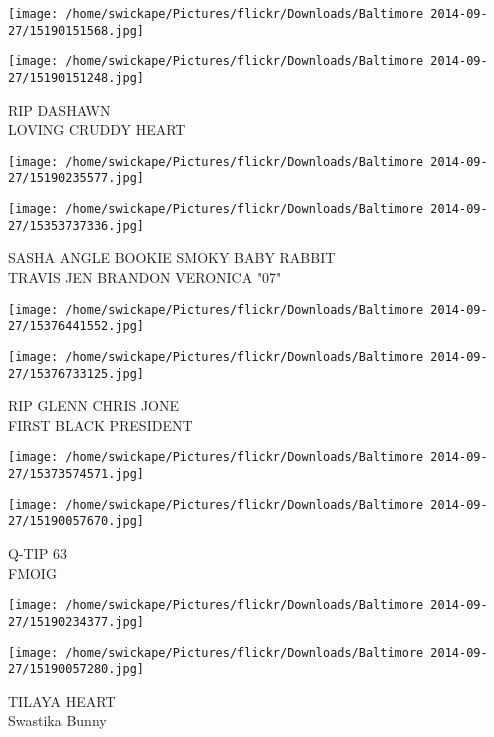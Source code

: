 \documentclass[10pt,letterpaper]{article}
\begin{document}
\texttt{[image: /home/swickape/Pictures/flickr/Downloads/Baltimore 2014-09-27/15190151568.jpg]}

\vspace{0.25in}
\texttt{[image: /home/swickape/Pictures/flickr/Downloads/Baltimore 2014-09-27/15190151248.jpg]}

RIP DASHAWN\\
LOVING CRUDDY HEART\\
\pagebreak

\texttt{[image: /home/swickape/Pictures/flickr/Downloads/Baltimore 2014-09-27/15190235577.jpg]}

\vspace{0.25in}
\texttt{[image: /home/swickape/Pictures/flickr/Downloads/Baltimore 2014-09-27/15353737336.jpg]}

SASHA ANGLE BOOKIE SMOKY BABY RABBIT\\
TRAVIS JEN BRANDON VERONICA "07"\\
\pagebreak

\texttt{[image: /home/swickape/Pictures/flickr/Downloads/Baltimore 2014-09-27/15376441552.jpg]}

\vspace{0.25in}
\texttt{[image: /home/swickape/Pictures/flickr/Downloads/Baltimore 2014-09-27/15376733125.jpg]}

RIP GLENN CHRIS JONE\\
FIRST BLACK PRESIDENT\\
\pagebreak

\texttt{[image: /home/swickape/Pictures/flickr/Downloads/Baltimore 2014-09-27/15373574571.jpg]}

\vspace{0.25in}
\texttt{[image: /home/swickape/Pictures/flickr/Downloads/Baltimore 2014-09-27/15190057670.jpg]}

Q{-}TIP 63\\
FMOIG\\
\pagebreak

\texttt{[image: /home/swickape/Pictures/flickr/Downloads/Baltimore 2014-09-27/15190234377.jpg]}

\vspace{0.25in}
\texttt{[image: /home/swickape/Pictures/flickr/Downloads/Baltimore 2014-09-27/15190057280.jpg]}

TILAYA HEART\\
Swastika Bunny\\
\pagebreak
\end{document}
